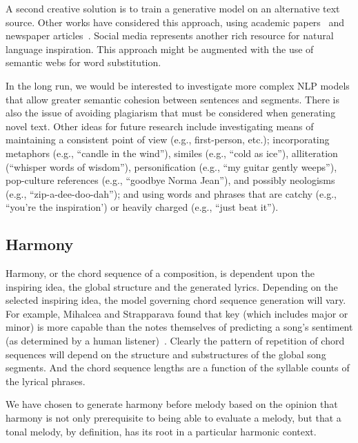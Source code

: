 \documentclass[11pt,phd]{byuprop}
\begin{document}
A second creative solution is to train a generative model on an alternative text source. Other works have considered this approach, using academic papers~\cite{scirea2015smug} and newspaper articles~\cite{toivanen2013automatical}. Social media represents another rich resource for natural language inspiration. This approach might be augmented with the use of semantic webs for word substitution.

In the long run, we would be interested to investigate more complex NLP models that allow greater semantic cohesion between sentences and segments. There is also the issue of avoiding plagiarism that must be considered when generating novel text. Other ideas for future research include investigating means of maintaining a consistent point of view (e.g., first-person, etc.); incorporating metaphors (e.g., ``candle in the wind''), similes (e.g., ``cold as ice''), alliteration (``whisper words of wisdom''), personification (e.g., ``my guitar gently weeps''), pop-culture references (e.g., ``goodbye Norma Jean''), and possibly neologisms (e.g., ``zip-a-dee-doo-dah''); and using words and phrases that are catchy (e.g., ``you're the inspiration') or heavily charged (e.g., ``just beat it'').

\subsection{Harmony}

Harmony, or the chord sequence of a composition, is dependent upon the inspiring idea, the global structure and the generated lyrics. Depending on the selected inspiring idea, the model governing chord sequence generation will vary. For example, Mihalcea and Strapparava found that key (which includes major or minor) is more capable than the notes themselves of predicting a song's sentiment (as determined by a human listener)~\cite{mihalcea2012lyrics}. Clearly the pattern of repetition of chord sequences will depend on the structure and substructures of the global song segments. And the chord sequence lengths are a function of the syllable counts of the lyrical phrases.

We have chosen to generate harmony before melody based on the opinion that harmony is not only prerequisite to being able to evaluate a melody, but that a tonal melody, by definition, has its root in a particular harmonic context.

\end{document}

